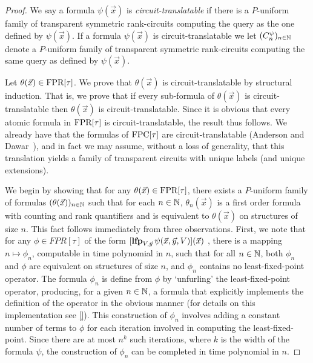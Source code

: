 \documentclass[../paper.tex]{subfiles}
\begin{document}
\begin{proof}
  We say a formula $\psi(\vec{x})$ is \emph{circuit-translatable} if there is a
  $P$-uniform family of transparent symmetric rank-circuits computing the query
  as the one defined by $\psi(\vec{x})$. If a formula $\psi(\vec{x})$ is
  circuit-translatable we let $(C^\psi_n)_{n \in \mathbb{N}}$ denote a $P$-uniform
  family of transparent symmetric rank-circuits computing the same query as
  defined by $\psi(\vec{x})$.
  
  Let $\theta(\vec{x}) \in \text{\upshape FPR}[\tau]$. We prove that $\theta(\vec{x})$ is
  circuit-translatable by structural induction. That is, we prove that if every
  sub-formula of $\theta(\vec{x})$ is circuit-translatable then
  $\theta(\vec{x})$ is circuit-translatable. Since it is obvious that every
  atomic formula in $\text{\upshape FPR}[\tau]$ is circuit-translatable, the result thus
  follows. We already have that the formulas of $\text{\upshape FPC}[\tau]$ are
  circuit-translatable (Anderson and Dawar~\cite{AndersonD17}), and in fact we
  may assume, without a loss of generality, that this translation yields a
  family of transparent circuits with unique labels (and unique extensions).

  We begin by showing that for any $\theta(\vec{x}) \in \text{\upshape FPR}[\tau]$, there
  exists a $P$-uniform family of formulas $(\theta(\vec{x}))_{n \in \mathbb{N}}$ such
  that for each $n \in \mathbb{N}$, $\theta_n(\vec{x})$ is a first order formula with
  counting and rank quantifiers and is equivalent to $\theta(\vec{x})$ on
  structures of size $n$. This fact follows immediately from three observations.
  First, we note that for any $\phi \in FPR[\tau]$ of the form $[\text{\textbf{lfp}}_{V,
    \vec{y}} \, \psi(\vec{x}, \vec{y}, V) ](\vec{x})$ , there is a mapping $n
  \mapsto \phi_n$, computable in time polynomial in $n$, such that for all $n
  \in \mathbb{N}$, both $\phi_n$ and $\phi$ are equivalent on structures of size $n$,
  and $\phi_n$ contains no least-fixed-point operator. The formula $\phi_n$ is
  define from $\phi$ by `unfurling' the least-fixed-point operator, producing,
  for a given $n \in \mathbb{N}$, a formula that explicitly implements the definition
  of the operator in the obvious manner (for details on this implementation see
  \ref{}). This construction of $\phi_n$ involves adding a constant number of
  terms to $\phi$ for each iteration involved in computing the
  least-fixed-point. Since there are at most $n^k$ such iterations, where $k$ is
  the width of the formula $\psi$, the construction of $\phi_n$ can be completed
  in time polynomial in $n$.


\end{proof}
\end{document}
